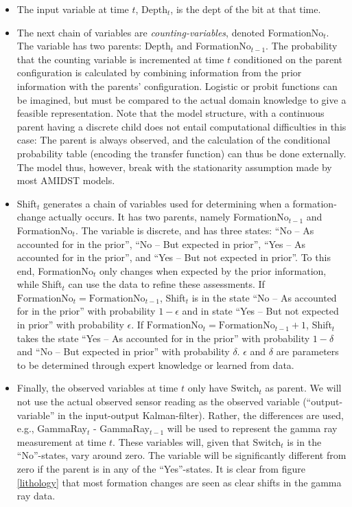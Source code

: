 \begin{itemize}

\item The input variable at time $t$, Depth$_t$, is the dept of the bit at that time.

\item The next chain of variables are \textit{counting-variables}, denoted FormationNo$_t$. The variable has two parents: Depth$_t$ and FormationNo$_{t-1}$. 
The probability that the counting variable is incremented at time $t$ conditioned on the parent configuration is calculated by combining information from the prior information with the parents' configuration. Logistic or probit functions can  be imagined, but must be compared to the actual domain knowledge to give a feasible representation.
Note that the model structure, with  a continuous parent having a discrete child does not entail computational difficulties in this case: The parent is always observed, and the calculation of the conditional probability table (encoding the transfer function) can thus be done externally. The model thus, however, break with the stationarity assumption made by most  AMIDST models.
\item Shift$_t$  generates a  chain of variables used for determining when   a formation-change actually occurs. It has two parents, namely  FormationNo$_{t-1}$ and  FormationNo$_t$. 
The variable is discrete, and has three states: ``No -- As accounted for in the prior'', ``No -- But expected in prior'', ``Yes -- As accounted for in the prior'', and ``Yes -- But not expected in prior''. 
To this end, FormationNo$_t$ only changes when expected by the prior information, while Shift$_t$ can use the data to refine these assessments. If $\mbox{FormationNo}_{t}= \mbox{FormationNo}_{t-1}$, Shift$_t$ is in the state 
 ``No -- As accounted for in the prior'' with probability $1-\epsilon$ and in state ``Yes -- But not expected in prior'' with probability $\epsilon$. If $\mbox{FormationNo}_{ t}=\mbox{FormationNo}_{t-1}+1$, Shift$_t$ takes the state 
``Yes -- As accounted for in the prior'' with probability $1-\delta$ and ``No -- But expected in prior'' with probability $\delta$. $\epsilon$ and $\delta$ are parameters to be determined through expert knowledge or learned from data.

\item Finally, the observed variables at time $t$ only have  Switch$_t$ as parent. We will not use the actual observed sensor reading as the observed variable (``output-variable'' in the input-output Kalman-filter). Rather, the differences are used, e.g., GammaRay$_t$ - GammaRay$_{t-1}$ will be used to represent the gamma ray measurement at time $t$. These variables will, given that Switch$_t$ is in the ``No''-states, vary around zero. The variable will be significantly different from zero if the parent is in any of the ``Yes''-states.  It is clear from figure \ref{lithology} that most formation changes are seen as clear shifts in the gamma ray data.
\end{itemize}

